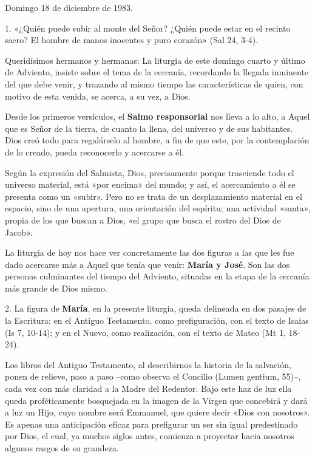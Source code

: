 \documentclass[]{article}
\begin{document}
Domingo 18 de diciembre de 1983.

1. «¿Quién puede subir al monte del Señor? ¿Quién puede estar en el
recinto sacro? El hombre de manos inocentes y puro corazón» (Sal 24,
3-4).

Queridísimos hermanos y hermanas: La liturgia de este domingo cuarto y
último de Adviento, insiste sobre el tema de la cercanía, recordando la
llegada inminente del que debe venir, y trazando al mismo tiempo las
características de quien, con motivo de esta venida, se acerca, a su
vez, a Dios.

Desde los primeros versículos, el \textbf{Salmo responsorial} nos lleva
a lo alto, a Aquel que es Señor de la tierra, de cuanto la llena, del
universo y de sus habitantes. Dios creó todo para regalárselo al hombre,
a fin de que este, por la contemplación de lo creado, pueda reconocerlo
y acercarse a él.

Según la expresión del Salmista, Dios, precisamente porque trasciende
todo el universo material, está «por encima» del mundo; y así, el
acercamiento a él se presenta como un «subir». Pero no se trata de un
desplazamiento material en el espacio, sino de una apertura, una
orientación del espíritu; una actividad «santa», propia de los que
buscan a Dios, «el grupo que busca el rostro del Dios de Jacob».

La liturgia de hoy nos hace ver concretamente las dos figuras a las que
les fue dado acercarse más a Aquel que tenía que venir: \textbf{María y
José}. Son las dos personas culminantes del tiempo del Adviento,
situadas en la etapa de la cercanía más grande de Dios mismo.

2. La figura de \textbf{María}, en la presente liturgia, queda delineada
en dos pasajes de la Escritura: en el Antiguo Testamento, como
prefiguración, con el texto de Isaías (Is 7, 10-14); y en el Nuevo, como
realización, con el texto de Mateo (Mt 1, 18-24).

Los libros del Antiguo Testamento, al describirnos la historia de la
salvación, ponen de relieve, paso a paso --como observa el Concilio
(Lumen gentium, 55)--, cada vez con más claridad a la Madre del
Redentor. Bajo este haz de luz ella queda proféticamente bosquejada en
la imagen de la Virgen que concebirá y dará a luz un Hijo, cuyo nombre
será Emmanuel, que quiere decir «Dios con nosotros». Es apenas una
anticipación eficaz para prefigurar un ser sin igual predestinado por
Dios, el cual, ya muchos siglos antes, comienza a proyectar hacia
nosotros algunos rasgos de su grandeza.
\end{document}
